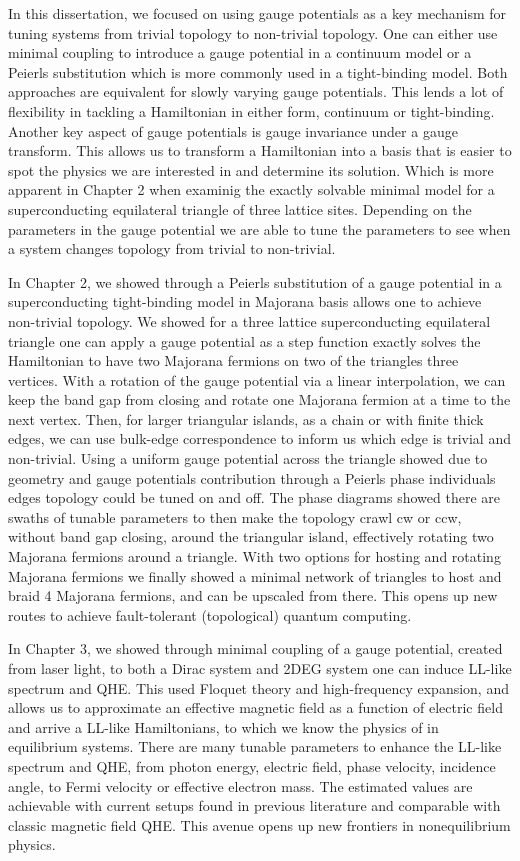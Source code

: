 In this dissertation, we focused on using gauge potentials as a key mechanism for tuning systems from trivial topology to non-trivial topology.
One can either use minimal coupling to introduce a gauge potential in a continuum model or a Peierls substitution which is more commonly used in a tight-binding model.
Both approaches are equivalent for slowly varying gauge potentials.
This lends a lot of flexibility in tackling a Hamiltonian in either form, continuum or tight-binding.
Another key aspect of gauge potentials is gauge invariance under a gauge transform.
This allows us to transform a Hamiltonian into a basis that is easier to spot the physics we are interested in and determine its solution.
Which is more apparent in Chapter 2 when examinig the exactly solvable minimal model for a superconducting equilateral triangle of three lattice sites.
Depending on the parameters in the gauge potential we are able to tune the parameters to see when a system changes topology from trivial to non-trivial.

In Chapter 2, we showed through a Peierls substitution of a gauge potential in a superconducting tight-binding model in Majorana basis allows one to achieve non-trivial topology.
We showed for a three lattice superconducting equilateral triangle one can apply a gauge potential as a step function exactly solves the Hamiltonian to have two Majorana fermions on two of the triangles three vertices.
With a rotation of the gauge potential via a linear interpolation, we can keep the band gap from closing and rotate one Majorana fermion at a time to the next vertex.
Then, for larger triangular islands, as a chain or with finite thick edges, we can use bulk-edge correspondence to inform us which edge is trivial and non-trivial.
Using a uniform gauge potential across the triangle showed due to geometry and gauge potentials contribution through a Peierls phase individuals edges topology could be tuned on and off.
The phase diagrams showed there are swaths of tunable parameters to then make the topology crawl cw or ccw, without band gap closing, around the triangular island, effectively rotating two Majorana fermions around a triangle.
With two options for hosting and rotating Majorana fermions we finally showed a minimal network of triangles to host and braid 4 Majorana fermions, and can be upscaled from there.
This opens up new routes to achieve fault-tolerant (topological) quantum computing.

In Chapter 3, we showed through minimal coupling of a gauge potential, created from laser light, to both a Dirac system and 2DEG system one can induce LL-like spectrum and QHE.
This used Floquet theory and high-frequency expansion, and allows us to approximate an effective magnetic field as a function of electric field and arrive a LL-like Hamiltonians, to which we know the physics of in equilibrium systems.
There are many tunable parameters to enhance the LL-like spectrum and QHE, from photon energy, electric field, phase velocity, incidence angle, to Fermi velocity or effective electron mass.
The estimated values are achievable with current setups found in previous literature and comparable with classic magnetic field QHE.
This avenue opens up new frontiers in nonequilibrium physics.

